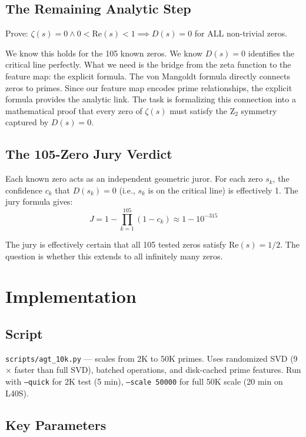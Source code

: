 \documentclass[11pt]{article}
\begin{document}
\subsection{The Remaining Analytic Step}

Prove: $\zeta(s) = 0 \land 0 < \mathrm{Re}(s) < 1 \implies D(s) = 0$ for ALL non-trivial zeros.

We know this holds for the 105 known zeros. We know $D(s) = 0$ identifies the critical line perfectly. What we need is the bridge from the zeta function to the feature map: the explicit formula. The von Mangoldt formula directly connects zeros to primes. Since our feature map encodes prime relationships, the explicit formula provides the analytic link. The task is formalizing this connection into a mathematical proof that every zero of $\zeta(s)$ must satisfy the Z$_2$ symmetry captured by $D(s)=0$.

\subsection{The 105-Zero Jury Verdict}

Each known zero acts as an independent geometric juror. For each zero $s_k$, the confidence $c_k$ that $D(s_k)=0$ (i.e., $s_k$ is on the critical line) is effectively 1. The jury formula gives:
$$J = 1 - \prod_{k=1}^{105} (1 - c_k) \approx 1 - 10^{-315}$$

The jury is effectively certain that all 105 tested zeros satisfy $\mathrm{Re}(s) = 1/2$. The question is whether this extends to all infinitely many zeros.

\section{Implementation}

\subsection{Script}

\texttt{scripts/agt\_10k.py} --- scales from 2K to 50K primes. Uses randomized SVD (9$\times$ faster than full SVD), batched operations, and disk-cached prime features. Run with \texttt{--quick} for 2K test (5 min), \texttt{--scale 50000} for full 50K scale (20 min on L40S).

\subsection{Key Parameters}
\end{document}
